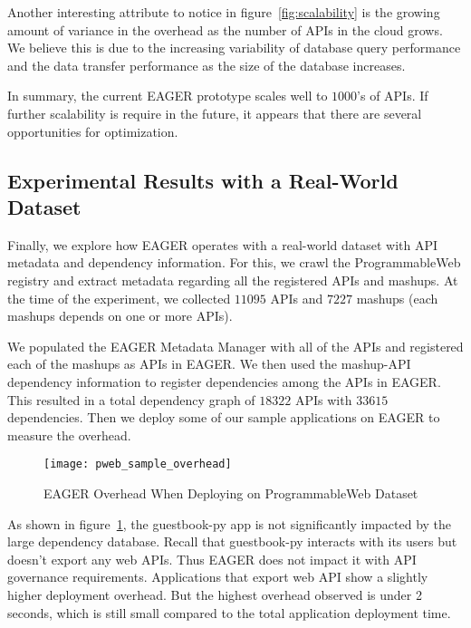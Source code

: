 Another interesting attribute to notice in figure~\ref{fig:scalability} is the
growing amount of variance in the overhead as the number of APIs in the cloud
grows.  We believe this is due to the increasing variability of database query
performance and the data transfer performance as the size of the database
increases.

In summary, the current EAGER prototype scales well to $1000$'s of APIs.
If further scalability is require in the future, it appears that there are
several opportunities for optimization.

\subsection{Experimental Results with a Real-World Dataset}

Finally, we explore how EAGER operates with a real-world dataset with API
metadata and dependency information. For this, we crawl the ProgrammableWeb
registry and extract metadata regarding all the registered APIs and mashups.
At the time of the experiment, we collected $11095$ APIs and $7227$ 
mashups (each mashups depends on one or more APIs).

We populated the EAGER Metadata Manager with all of the APIs and
registered each of the mashups as APIs in EAGER. We then used the
mashup-API dependency information to register dependencies among the APIs in 
EAGER. This resulted in a 
total dependency graph of $18322$ APIs with $33615$ dependencies. 
Then we deploy
some of our sample applications on EAGER to measure the overhead.

\begin{figure}
\centering
\texttt{[image: pweb\_sample\_overhead]}
\vspace{-0.01in}
\caption{EAGER Overhead When Deploying on ProgrammableWeb Dataset}
\label{fig:pweb_sample_overhead}
\end{figure}

As shown in figure~\ref{fig:pweb_sample_overhead}, the guestbook-py app is not
significantly impacted by the large dependency database. 
Recall that 
guestbook-py interacts with its users but doesn't export any 
web APIs.  Thus EAGER does not impact it with API
governance requirements. 
Applications that export web API show a slightly higher deployment overhead. 
But the highest overhead observed is under 2 seconds, which is still small 
compared
to the total application deployment time. 

